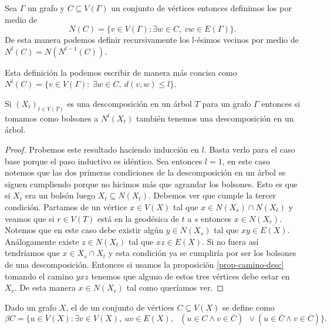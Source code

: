 \documentclass[tesis.tex]{subfiles}
\begin{document}
\begin{deff}
	Sea $\Gamma$ un grafo y $C \subseteq V(\Gamma)$ un conjunto de vértices entonces definimos los  por medio de 
	\[
	N(C) = \{ v \in V(\Gamma) : \exists w \in C, \ vw \in E(\Gamma) \}.
	\]
	De esta manera podemos definir recursivamente los l-ésimos vecinos por medio de $N^l(C) = N(N^{l-1}(C))$.
\end{deff}

\begin{obs}
	Esta definición la podemos escribir de manera más concisa como $N^l (C) = \{ v \in V(\Gamma) : \ \exists w \in C, \  d(v,w) \le l  \}$.
\end{obs}

\begin{prop}\label{prop-vecinos-desc}
	Si $(X_t)_{t \in V(T)}$ es una descomposición en un árbol $T$ para un grafo $\Gamma$ entonces si tomamos como bolsones a $N^l(X_t)$ también tenemos una descomposición en un árbol.
\end{prop}
\begin{proof}
	Probemos este resultado haciendo inducción en $l$.
	Basta verlo para el caso base porque el paso inductivo es idéntico. 
	Sea entonces $l=1$, en este caso notemos que las dos primeras condiciones de la descomposición en un árbol se siguen cumpliendo porque no hicimos más que agrandar los bolsones. 
	Esto es que si $X_t$ era un bolsón luego $X_t \subseteq N(X_t)$.
	Debemos ver que cumple la tercer condición.
	Partamos de un vértice $x \in V(X)$ tal que $x \in N(X_s) \cap N(X_t)$ y veamos que si $r \in V(T)$ está en la geodésica de $t$ a $s$ entonces $x \in N(X_r)$.
	Notemos que en este caso debe existir algún $y \in N(X_s)$ tal que $xy \in E(X)$.
	Análogamente existe $z \in N(X_t)$ tal que $xz \in E(X)$.
	Si no fuera así tendríamos que $x \in X_s \cap X_t$ y esta condición ya se cumpliría por ser los bolsones de una descomposición.
	Entonces si usamos la proposición \ref{prop-camino-desc} tomando el camino $yxz$ tenemos que alguno de estos tres vértices debe estar en $X_r$.
	De esta manera $x \in N(X_r)$ tal como queríamos ver.
\end{proof}
\medskip

\begin{deff}
	Dado un grafo $X$, el  de un conjunto de vértices $C \subseteq V(X)$ se define como
	\[
	\beta C = \{ u \in V(X) : \exists v \in V(X), \ uv \in E(X), \  \ \ (u \in C \wedge v \in \overline C) \ \ \lor  (u \in \overline C \wedge v \in  C)   \}.
	\] 
\end{deff}
\end{document}
